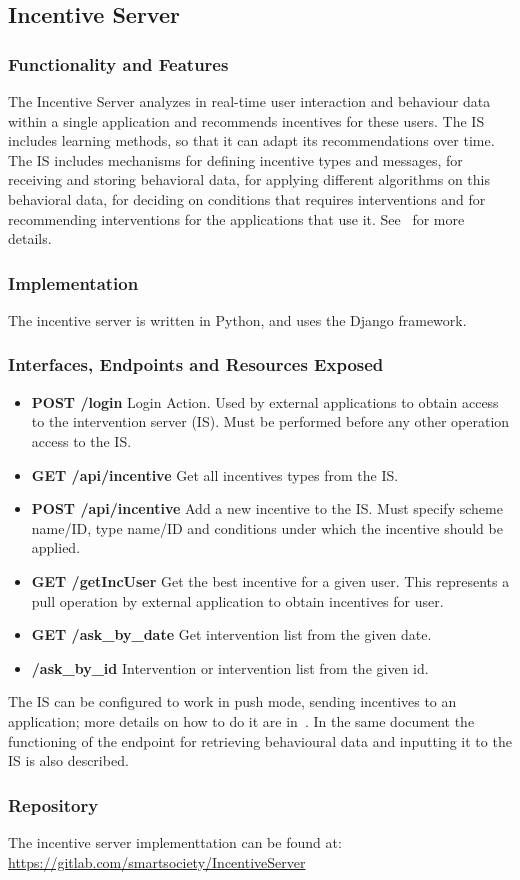 \subsection{Incentive Server}
\subsubsection{Functionality and Features}
The Incentive Server analyzes in real-time user interaction and behaviour data within a single application and recommends incentives for these  users. The IS includes learning methods, so that it can adapt its recommendations over time. The IS includes mechanisms for defining  incentive types and messages, for receiving and storing behavioral data, for applying different  algorithms on this behavioral data, for deciding on conditions that requires interventions and for  recommending interventions for the applications that use it. See~\cite{D5.4} for more details.
\subsubsection{Implementation}
The incentive server is written in Python, and uses the Django framework. 
\subsubsection{Interfaces, Endpoints and Resources Exposed}
\begin{itemize}
\item {\bf POST /login} Login Action. Used by external applications to obtain access to the intervention server (IS). Must be performed before any other operation access to the IS.
\item {\bf GET /api/incentive} Get all incentives types from the IS.
\item {\bf POST /api/incentive} Add a new incentive to the IS. Must specify scheme name/ID, type name/ID and conditions under which the incentive should be applied.
\item {\bf GET /getIncUser} Get the best incentive for a given user. This represents a pull operation by external application to obtain incentives for user.
\item {\bf GET /ask\_by\_date}  Get intervention list from the given date.  
\item {\bf /ask\_by\_id} Intervention or intervention list from the given id. 
\end{itemize}
The IS can be configured to work in push mode, sending incentives to an application; more details on how to do it are in~\cite{D5.4}. In the same document the functioning of the endpoint for retrieving behavioural data and inputting it to the IS is also described.
\subsubsection{Repository}
The incentive server implementtation can be found at: \url{https://gitlab.com/smartsociety/IncentiveServer}